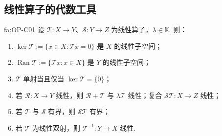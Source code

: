 \subsection{线性算子的代数工具}

\begin{FAProposition}[C][线性算子计算工具]{fa:OP-C01}
设 \(\displaystyle \mathcal T:X\to Y\)、\(\displaystyle \mathcal S:Y\to Z\) 为线性算子，\(\displaystyle \lambda\in\mathbb K\). 则：
\begin{enumerate}[label=\textnormal{(\roman*)}]
\item \(\displaystyle \ker\mathcal T:=\{x\in X:\mathcal T x=0\}\) 是 \(\displaystyle X\) 的线性子空间；
\item \(\displaystyle \operatorname{Ran}\mathcal T:=\{\mathcal T x:x\in X\}\) 是 \(\displaystyle Y\) 的线性子空间；
\item \(\displaystyle \mathcal T\) 单射当且仅当 \(\displaystyle \ker\mathcal T=\{0\}\)；
\item 若 \(\displaystyle \mathcal R:X\to Y\) 线性，则 \(\displaystyle \mathcal R+\mathcal T\) 与 \(\displaystyle \lambda\mathcal T\) 线性；复合 \(\displaystyle \mathcal S\mathcal T:X\to Z\) 线性；
\item 若 \(\displaystyle \mathcal T\) 与 \(\displaystyle \mathcal S\) 有界，则 \(\displaystyle \mathcal S\mathcal T\) 有界；
\item 若 \(\displaystyle \mathcal T\) 为线性双射，则 \(\displaystyle \mathcal T^{-1}:Y\to X\) 线性.
\end{enumerate}
\end{FAProposition}

